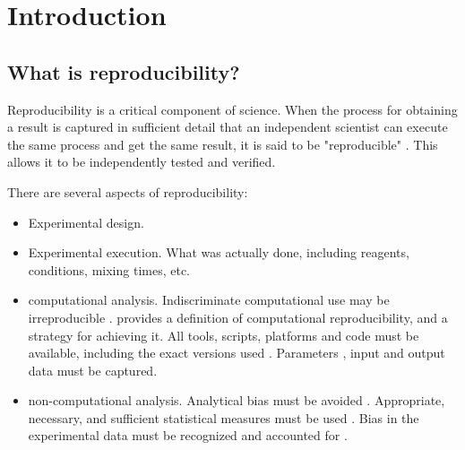 \chapter{Introduction}


\section{What is reproducibility?}
Reproducibility is a critical component of science.
When the process for obtaining a result is captured in sufficient detail that
an independent scientist can execute the same process and get the same result,
it is said to be "reproducible" \cite{russell2013reproducibility, nih2014reproducibility}.
This allows it to be independently tested and verified.

There are several aspects of reproducibility: 
\begin{itemize}

  \item Experimental design.

  \item Experimental execution.  What was actually done, including reagents, conditions,
    mixing times, etc.

  \item computational analysis.  Indiscriminate computational use may be irreproducible \cite{donoho2009, peng2011reproducible}.  
    \cite{donoho_wavelab} provides a definition of computational reproducibility, and a strategy for achieving it.
    All tools, scripts, platforms and code must be available, including the exact versions used
    \cite{ince2012open, nekrutenko2012next, blankenberg2014dissemination}.
    Parameters \cite{landis2012call}, input and output data must be captured.

  \item non-computational analysis.  Analytical bias must be avoided \cite{sackett1979bias}.
    Appropriate, necessary, and sufficient statistical measures must be used 
    \cite{ioannidis2005most, nuzzo2014statistical, begley2013reproducibility,
          pashler2012replicability, vaux2012numbers}.
    Bias in the experimental data must be recognized
    and accounted for \cite{macarthur2012reproducibility, wagenmakers2012agenda}.

\end{itemize}



